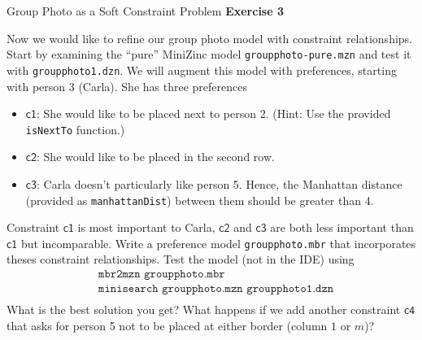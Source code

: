 \begin{frame}{Group Photo as a Soft Constraint Problem} \small
\textbf{Exercise 3}

Now we would like to refine our group photo model with constraint relationships.
Start by examining the ``pure'' MiniZinc model \texttt{groupphoto-pure.mzn} and test it with \texttt{groupphoto1.dzn}.
We will augment this model with preferences, starting with person 3 (Carla). She has three preferences
\begin{itemize}
\item $\mathsf{c1}$: She would like to be placed next to person 2. (Hint: Use the provided \texttt{isNextTo} function.)
\item $\mathsf{c2}$: She would like to be placed in the second row.
\item $\mathsf{c3}$: Carla doesn't particularly like person 5. Hence, the Manhattan distance (provided as \texttt{manhattanDist}) between them should be greater than 4.
\end{itemize}
Constraint $\mathsf{c1}$ is most important to Carla, $\mathsf{c2}$ and $\mathsf{c3}$ are both less important than $\mathsf{c1}$ but incomparable. Write a preference model \texttt{groupphoto.mbr} that incorporates theses constraint relationships. Test the model (not in the IDE) using
\begin{align*}
&\texttt{mbr2mzn groupphoto.mbr} \\
&\texttt{minisearch groupphoto.mzn groupphoto1.dzn} \\
\end{align*}
What is the best solution you get? What happens if we add another constraint $\mathsf{c4}$ that asks for person 5 not to be placed at either border (column $1$ or $m$)?

\end{frame}

